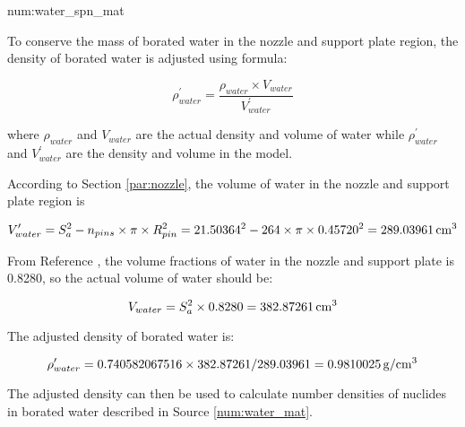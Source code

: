 \begin{numitem}{num:water_spn_mat}

To conserve the mass of borated water in the nozzle and support plate region, the
density of borated water is adjusted using formula:

\[
    \rho^\prime_{water} = \frac{\rho_{water} \times V_{water}}{V^\prime_{water}}
\]

where $\rho_{water}$ and $V_{water}$ are the actual density and volume of water
while $\rho^\prime_{water}$ and $V^\prime_{water}$ are the density and volume
in the model.

According to Section \ref{par:nozzle}, the volume of water in the nozzle and
support plate region is

\[
   V^\prime_{water} = S_a^2 - n_{pins}\times \pi \times R_{pin}^2 = 21.50364^2 - 264\times\pi\times 0.45720^2 = 289.03961\,\rm{cm^3}
\]

From Reference \cite{ml033530020}, the volume fractions of water in the nozzle 
and support plate is 0.8280, so the actual volume of water should be:

\[
    V_{water} = S_a^2\times 0.8280 = 382.87261\,\rm{cm^3}
\]


The adjusted density of borated water is:

\[
    \rho^\prime_{water} = 0.740582067516 \times 382.87261 / 289.03961 = 0.9810025\,\rm{g/cm^3}
\]

The adjusted density can then be used to calculate number densities 
of nuclides in borated water described in Source \ref{num:water_mat}.


\end{numitem}


